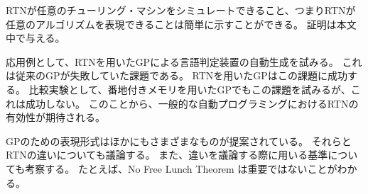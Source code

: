 \documentclass[9pt]{jsarticle}
\begin{document}
RTNが任意のチューリング・マシンをシミュレートできること、つまりRTNが任意のアルゴリズムを表現できることは簡単に示すことができる。
証明は本文中で与える。

応用例として、RTNを用いたGPによる言語判定装置の自動生成を試みる。
これは従来のGPが失敗していた課題である。
RTNを用いたGPはこの課題に成功する。
比較実験として、番地付きメモリを用いたGPでもこの課題を試みるが、これは成功しない。
このことから、一般的な自動プログラミングにおけるRTNの有効性が期待される。

GPのための表現形式はほかにもさまざまなものが提案されている。
それらとRTNの違いについても議論する。
また、違いを議論する際に用いる基準についても考察する。
たとえば、No Free Lunch Theorem は重要ではないことがわかる。
\end{document}
